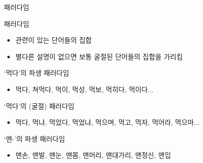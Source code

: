 \documentclass[11pt, aspectratio=169]{beamer}
\begin{document}
\begin{frame}[t]{패러다임}
  \begin{block}{패러다임}
    \begin{itemize}
      \item 관련이 있는 단어들의 집합
      \item 별다른 설명이 없으면 보통 굴절된 단어들의 집합을 가리킴
    \end{itemize}
  \end{block}
  ‘먹다’의 파생 패러다임
  \begin{itemize}
    \item 먹다, 쳐먹다, 먹이, 먹성, 먹보, 먹히다, 먹이다... 
  \end{itemize}
  ‘먹다’의 (굴절) 패러다임
  \begin{itemize}
    \item 먹다, 먹냐, 먹었다, 먹었냐, 먹으며, 먹고, 먹자, 먹어라, 먹으마... 
  \end{itemize}
  ‘맨-’의 파생 패러다임
  \begin{itemize}
    \item 맨손, 맨발, 맨눈, 맨몸, 맨머리, 맨대가리, 맨정신, 맨입
  \end{itemize}
\end{frame}
\end{document}
